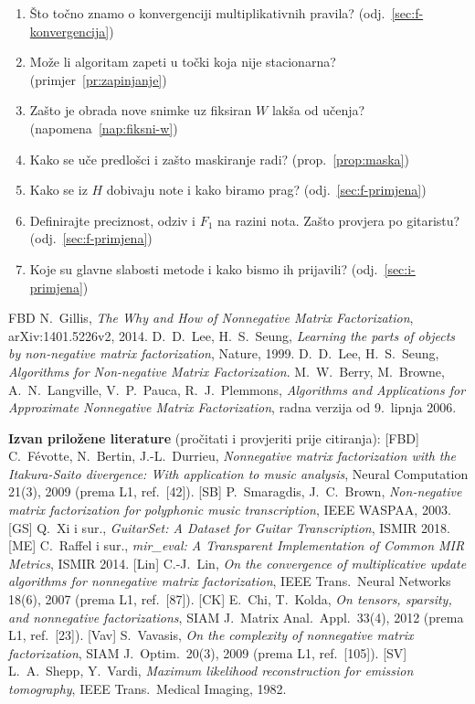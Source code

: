 \documentclass[11pt,a4paper]{article}
\theoremstyle{definition}
\theoremstyle{plain}
\theoremstyle{remark}
\begin{document}
\begin{enumerate}
\item Što točno znamo o konvergenciji multiplikativnih pravila? (odj.~\ref{sec:f-konvergencija})
\item Može li algoritam zapeti u točki koja nije stacionarna? (primjer~\ref{pr:zapinjanje})
\item Zašto je obrada nove snimke uz fiksiran $W$ lakša od učenja? (napomena~\ref{nap:fiksni-w})
\item Kako se uče predlošci i zašto maskiranje radi? (prop.~\ref{prop:maska})
\item Kako se iz $H$ dobivaju note i kako biramo prag? (odj.~\ref{sec:f-primjena})
\item Definirajte preciznost, odziv i $F_1$ na razini nota. Zašto provjera po gitaristu?
  (odj.~\ref{sec:f-primjena})
\item Koje su glavne slabosti metode i kako bismo ih prijavili? (odj.~\ref{sec:i-primjena})
\end{enumerate}

\begin{thebibliography}{FBD}
\small
{} N.~Gillis, \emph{The Why and How of Nonnegative Matrix Factorization},
  arXiv:1401.5226v2, 2014.
 D.~D.~Lee, H.~S.~Seung, \emph{Learning the parts of objects by non-negative matrix
  factorization}, Nature, 1999.
 D.~D.~Lee, H.~S.~Seung, \emph{Algorithms for Non-negative Matrix Factorization}.
 M.~W.~Berry, M.~Browne, A.~N.~Langville, V.~P.~Pauca, R.~J.~Plemmons,
  \emph{Algorithms and Applications for Approximate Nonnegative Matrix Factorization}, radna verzija
  od 9.~lipnja 2006.
\end{thebibliography}

{\small\textbf{Izvan priložene literature} (pročitati i provjeriti prije citiranja):
[FBD] C.~Févotte, N.~Bertin, J.-L.~Durrieu, \emph{Nonnegative matrix factorization with the
Itakura-Saito divergence: With application to music analysis}, Neural Computation 21(3), 2009
(prema L1, ref.~[42]).
[SB] P.~Smaragdis, J.~C.~Brown, \emph{Non-negative matrix factorization for polyphonic music
transcription}, IEEE WASPAA, 2003.
[GS] Q.~Xi i sur., \emph{GuitarSet: A Dataset for Guitar Transcription}, ISMIR 2018.
[ME] C.~Raffel i sur., \emph{mir\_eval: A Transparent Implementation of Common MIR Metrics}, ISMIR 2014.
[Lin] C.-J.~Lin, \emph{On the convergence of multiplicative update algorithms for nonnegative matrix
factorization}, IEEE Trans.\ Neural Networks 18(6), 2007 (prema L1, ref.~[87]).
[CK] E.~Chi, T.~Kolda, \emph{On tensors, sparsity, and nonnegative factorizations}, SIAM J.\ Matrix
Anal.\ Appl.\ 33(4), 2012 (prema L1, ref.~[23]).
[Vav] S.~Vavasis, \emph{On the complexity of nonnegative matrix factorization}, SIAM J.\ Optim.\
20(3), 2009 (prema L1, ref.~[105]).
[SV] L.~A.~Shepp, Y.~Vardi, \emph{Maximum likelihood reconstruction for emission tomography}, IEEE
Trans.\ Medical Imaging, 1982.\par}
\end{document}
